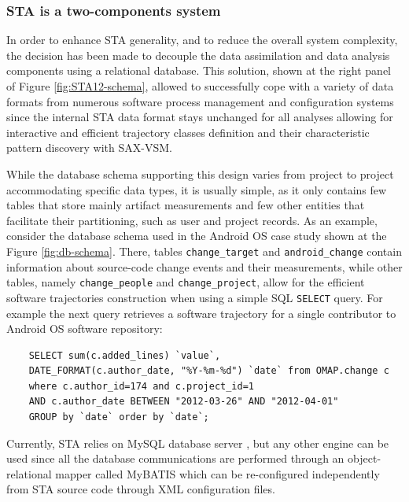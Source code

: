 \subsubsection{STA is a two-components system}\label{two_components}
In order to enhance STA generality, and to reduce the overall system complexity, the decision has been made to decouple the data assimilation and data analysis components using a relational database. This solution, shown at the right panel of Figure \ref{fig:STA12-schema}, allowed to successfully cope with a variety of data formats from numerous software process management and configuration systems since the internal STA data format stays unchanged for all analyses allowing for interactive and efficient trajectory classes definition and their characteristic pattern discovery with \mbox{SAX-VSM}. 

While the database schema supporting this design varies from project to project accommodating specific data types, it is usually simple, as it only contains few tables that store mainly artifact measurements and few other entities that facilitate their partitioning, such as user and project records. As an example, consider the database schema used in the Android OS case study shown at the Figure \ref{fig:db-schema}. There, tables \texttt{change\_target} and \texttt{android\_change} contain information about source-code change events and their measurements, while other tables, namely \texttt{change\_people} and \texttt{change\_project}, allow for the efficient software trajectories construction when using a simple SQL \texttt{SELECT} query. For example the next query retrieves a software trajectory for a single contributor to Android OS software repository: 
\begin{verbatim}
    SELECT sum(c.added_lines) `value`, 
    DATE_FORMAT(c.author_date, "%Y-%m-%d") `date` from OMAP.change c
    where c.author_id=174 and c.project_id=1
    AND c.author_date BETWEEN "2012-03-26" AND "2012-04-01"
    GROUP by `date` order by `date`;
\end{verbatim}

Currently, STA relies on MySQL database server \cite{mysql}, but any other engine can be used since all the database communications are performed through an object-relational mapper called MyBATIS \cite{mybatis} which can be re-configured independently from STA source code through XML configuration files.

